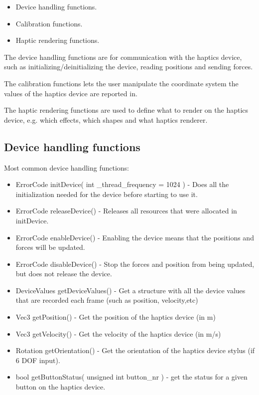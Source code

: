 \begin{itemize}
\item Device handling functions.
\item Calibration functions.
\item Haptic rendering functions.
\end{itemize}

The device handling functions are for communication with the haptics device, such as initializing/deinitializing the device, reading positions and sending forces. 

The calibration functions lets the user manipulate the coordinate system the values of the haptics device are reported in.

The haptic rendering functions are used to define what to render on the haptics device, e.g. which effects, which shapes and what haptics renderer.

\subsection{Device handling functions}

Most common device handling functions:

\begin{itemize}
\item ErrorCode initDevice( int \_thread\_frequency = 1024 ) -  Does all the initialization needed for the
device before starting to use it.
\item ErrorCode releaseDevice() - Releases all resources that were allocated
in initDevice.
\item ErrorCode enableDevice() - Enabling the device means that the
positions and forces will be updated.  
\item ErrorCode disableDevice() - Stop the forces and position
from being updated, but does not release the device.
\item DeviceValues getDeviceValues() - Get a structure with all the
  device values that are recorded each frame (such as position,
  velocity,etc)
\item Vec3 getPosition() - Get the position of the haptics device (in
  m)
\item Vec3 getVelocity() - Get the velocity of the haptics device (in
  m/s)
\item Rotation getOrientation() - Get the orientation of the haptics
  device stylus (if 6 DOF input).
\item bool getButtonStatus( unsigned int button\_nr ) - get the status
  for a given button on the haptics device.
\end{itemize}

